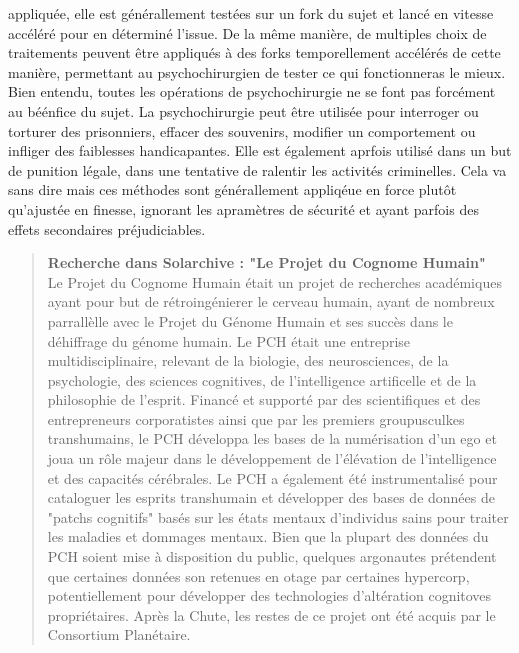 appliquée, elle est générallement testées sur un fork du sujet et lancé en vitesse accéléré pour en déterminé l'issue. De la même manière, de multiples choix de traitements peuvent être appliqués à des forks temporellement accélérés de cette manière, permettant au psychochirurgien de tester ce qui fonctionneras le mieux. Bien entendu, toutes les opérations de psychochirurgie ne se font pas forcément au béénfice du sujet. La psychochirurgie peut être utilisée pour interroger ou torturer des prisonniers, effacer des souvenirs, modifier un comportement ou infliger des faiblesses handicapantes. Elle est également aprfois utilisé dans un but de punition légale, dans une tentative de ralentir les activités criminelles. Cela va sans dire mais ces méthodes sont générallement appliqéue en force plutôt qu'ajustée en finesse, ignorant les apramètres de sécurité et ayant parfois des effets secondaires préjudiciables. 



\begin{quotation} \textbf{Recherche dans Solarchive : "Le Projet du Cognome Humain" } \\ Le Projet du Cognome Humain était un projet de recherches académiques ayant pour but de rétroingénierer le cerveau humain, ayant de nombreux parrallèlle avec le Projet du Génome Humain et ses succès dans le déhiffrage du génome humain. Le PCH était une entreprise multidisciplinaire, relevant de la biologie, des neurosciences, de la psychologie, des sciences cognitives, de l'intelligence artificelle et de la philosophie de l'esprit. Financé et supporté par des scientifiques et des entrepreneurs corporatistes ainsi que par les premiers groupusculkes transhumains, le PCH développa les bases de la numérisation d'un ego et joua un rôle majeur dans le développement de l'élévation de l'intelligence et des capacités cérébrales. Le PCH a également été instrumentalisé pour cataloguer les esprits transhumain et développer des bases de données de "patchs cognitifs" basés sur les états mentaux d'individus sains pour traiter les maladies et dommages mentaux. Bien que la plupart des données du PCH soient mise à disposition du public, quelques argonautes prétendent que certaines données son retenues en otage par certaines hypercorp, potentiellement pour développer des technologies d'altération cognitoves propriétaires. Après la Chute, les restes de ce projet ont été acquis par le Consortium Planétaire. \end{quotation} 

